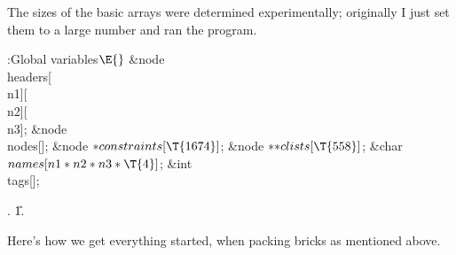 The sizes of the basic arrays were determined experimentally; originally
I just set them to a large number and ran the program.

\Y\B\4:Global variables\X${}\E{}$\6
\&{node} \\{headers}[\\{n1}][\\{n2}][\\{n3}];\6
\&{node} \\{nodes}[];\6
\&{node} ${}{*}\\{constraints}[\T{1674}]{}$;\6
\&{node} ${}{*}{*}\\{clists}[\T{558}]{}$;\6
\&{char} ${}\\{names}[\\{n1}*\\{n2}*\\{n3}*\T{4}]{}$;\6
\&{int} \\{tags}[];%
\par
{}.
\U1.\fi

Here's how we get everything started, when packing bricks as mentioned
above.


